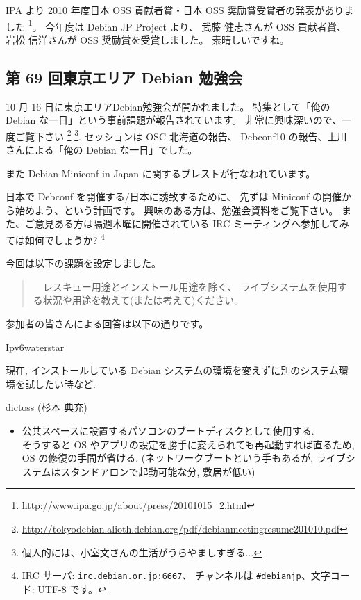\documentclass[mingoth,a4paper]{jsarticle}
\begin{document}
IPA より 2010 年度日本 OSS 貢献者賞・日本 OSS 奨励賞受賞者の発表がありました%
\footnote{\url{http://www.ipa.go.jp/about/press/20101015_2.html}}。
今年度は Debian JP Project より、
武藤 健志さんが OSS 貢献者賞、岩松 信洋さんが OSS 奨励賞を受賞しました。
素晴しいですね。

\subsection{第 69 回東京エリア Debian 勉強会}

10 月 16 日に東京エリアDebian勉強会が開かれました。
特集として「俺の Debian な一日」という事前課題が報告されています。
非常に興味深いので、一度ご覧下さい%
\footnote{%
\url{http://tokyodebian.alioth.debian.org/pdf/debianmeetingresume201010.pdf}}
\footnote{個人的には、小室文さんの生活がうらやましすぎる...}.
セッションは OSC 北海道の報告、
Debconf10 の報告、上川さんによる「俺の Debian な一日」でした。

また Debian Miniconf in Japan に関するブレストが行なわれています。

日本で Debconf を開催する/日本に誘致するために、
先ずは Miniconf の開催から始めよう、という計画です。
興味のある方は、勉強会資料をご覧下さい。
また、ご意見ある方は隔週木曜に開催されている
IRC ミーティングへ参加してみては如何でしょうか?
\footnote{%
IRC サーバ: {\tt{irc.debian.or.jp:6667}}、
チャンネルは {\tt{\#debianjp}}、文字コード: UTF-8 です。}


今回は以下の課題を設定しました。
%
\begin{quote}
    \begin{screen}
        　レスキュー用途とインストール用途を除く、
        ライブシステムを使用する状況や用途を教えて(または考えて)ください。
    \end{screen}
\end{quote}
%
参加者の皆さんによる回答は以下の通りです。

\begin{prework}{ Ipv6waterstar }

現在, インストールしている Debian システムの環境を変えずに別のシステム環境を試したい時など.

\end{prework}



\begin{prework}{ dictoss (杉本  典充) }

    \begin{itemize}
          \item 公共スペースに設置するパソコンのブートディスクとして使用する.
        　\\
        そうすると OS やアプリの設定を勝手に変えられても再起動すれば直るため, OS の修復の手間が省ける.
        (ネットワークブートという手もあるが, ライブシステムはスタンドアロンで起動可能な分, 敷居が低い)
\end{itemize}

\end{prework}
\end{document}
